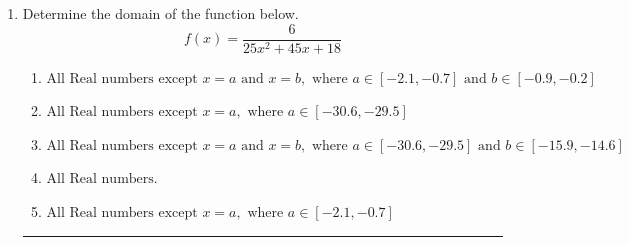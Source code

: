 \documentclass[14pt]{extbook}
\newcommand{\litem}[1]{\item#1\hspace*{-1cm}\rule{\textwidth}{0.4pt}}
\begin{document}
\begin{enumerate}
{\begin{enumerate}[label=\Alph*.]
\end{enumerate} }
\litem{
Determine the domain of the function below.\[ f(x) = \frac{6}{25x^{2} +45 x + 18} \]\begin{enumerate}[label=\Alph*.]
\item \( \text{All Real numbers except } x = a \text{ and } x = b, \text{ where } a \in [-2.1, -0.7] \text{ and } b \in [-0.9, -0.2] \)
\item \( \text{All Real numbers except } x = a, \text{ where } a \in [-30.6, -29.5] \)
\item \( \text{All Real numbers except } x = a \text{ and } x = b, \text{ where } a \in [-30.6, -29.5] \text{ and } b \in [-15.9, -14.6] \)
\item \( \text{All Real numbers.} \)
\item \( \text{All Real numbers except } x = a, \text{ where } a \in [-2.1, -0.7] \)


\end{enumerate}}
\end{enumerate}
\end{document}
